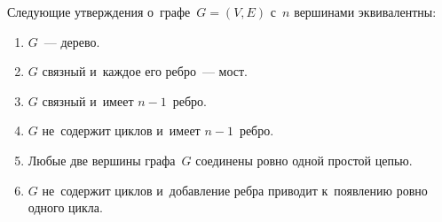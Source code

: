 \begin{theorem}
Следующие утверждения о~графе~$G = (V, E)$ с~$n$ вершинами эквивалентны:
\begin{enumerate}
	\item\label{st:about_tree_1} $G$~--- дерево.
	\item\label{st:about_tree_2} $G$ связный и~каждое его ребро~--- мост.
	\item\label{st:about_tree_3} $G$ связный и~имеет $n - 1$~ребро.
	\item\label{st:about_tree_4} $G$ не~содержит циклов и~имеет $n - 1$~ребро.
	\item\label{st:about_tree_5} Любые две вершины графа~$G$ соединены ровно одной простой цепью.
	\item\label{st:about_tree_6} $G$ не~содержит циклов и~добавление ребра приводит к~появлению ровно одного цикла.
\end{enumerate}
\end{theorem}

